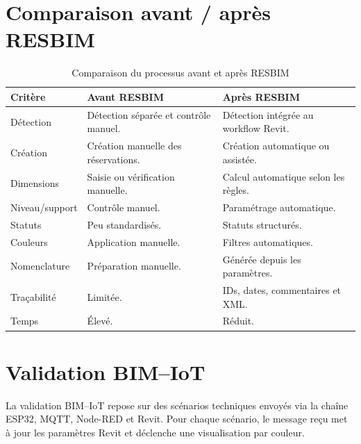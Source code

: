 \documentclass[12pt,a4paper]{report}
\begin{document}
\section{Comparaison avant / après RESBIM}
\begin{table}[H]
\centering
\caption{Comparaison du processus avant et après RESBIM}
\begin{tabularx}{0.95\textwidth}{|L{3.4cm}|L{5.1cm}|Y|}
\hline
\textbf{Critère} & \textbf{Avant RESBIM} & \textbf{Après RESBIM} \\
\hline
Détection & Détection séparée et contrôle manuel. & Détection intégrée au workflow Revit. \\
\hline
Création & Création manuelle des réservations. & Création automatique ou assistée. \\
\hline
Dimensions & Saisie ou vérification manuelle. & Calcul automatique selon les règles. \\
\hline
Niveau/support & Contrôle manuel. & Paramétrage automatique. \\
\hline
Statuts & Peu standardisés. & Statuts structurés. \\
\hline
Couleurs & Application manuelle. & Filtres automatiques. \\
\hline
Nomenclature & Préparation manuelle. & Générée depuis les paramètres. \\
\hline
Traçabilité & Limitée. & IDs, dates, commentaires et XML. \\
\hline
Temps & Élevé. & Réduit. \\
\hline
\end{tabularx}
\end{table}

\section{Validation BIM--IoT}
La validation BIM--IoT repose sur des scénarios techniques envoyés via la chaîne ESP32, MQTT, Node-RED et Revit. Pour chaque scénario, le message reçu met à jour les paramètres Revit et déclenche une visualisation par couleur.
\end{document}
